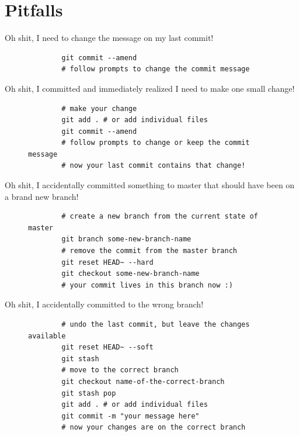 \section{Pitfalls}

\begin{frame}[fragile]{Oh shit, I need to change the message on my last commit!}
    \begin{figure}
    \begin{lstlisting}
        git commit --amend
        # follow prompts to change the commit message
    \end{lstlisting}
    \end{figure}
\end{frame}


\begin{frame}[fragile]{Oh shit, I committed and immediately realized I need to make one small change!}
    \begin{figure}
    \begin{lstlisting}
        # make your change
        git add . # or add individual files
        git commit --amend
        # follow prompts to change or keep the commit message
        # now your last commit contains that change!
    \end{lstlisting}
    \end{figure}
\end{frame}


\begin{frame}[fragile]{Oh shit, I accidentally committed something to master that should have been on a brand new branch!}
    \begin{figure}
    \begin{lstlisting}
        # create a new branch from the current state of master
        git branch some-new-branch-name
        # remove the commit from the master branch
        git reset HEAD~ --hard
        git checkout some-new-branch-name
        # your commit lives in this branch now :)
    \end{lstlisting}
    \end{figure}
\end{frame}


\begin{frame}[fragile]{Oh shit, I accidentally committed to the wrong branch!}
    \begin{figure}
    \begin{lstlisting}
        # undo the last commit, but leave the changes available
        git reset HEAD~ --soft
        git stash
        # move to the correct branch
        git checkout name-of-the-correct-branch
        git stash pop
        git add . # or add individual files
        git commit -m "your message here"
        # now your changes are on the correct branch
        \end{lstlisting}
\end{figure}
\end{frame}

